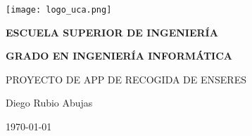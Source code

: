 

\begin{titlepage}

  \begin{center}

    \texttt{[image: logo\_uca.png]} \\
    
    \vspace{2.0cm}
    
    \LARGE{\textbf{ESCUELA SUPERIOR DE INGENIERÍA}} \\
    
    \vspace{1.0cm}
    
    \Large{\textbf{GRADO EN INGENIERÍA INFORMÁTICA}} \\
    
    \vspace{3.0cm}
    
    \Large{PROYECTO DE APP DE RECOGIDA DE ENSERES} \\
    
    \vspace{2.0cm}
    
    \Large{Diego Rubio Abujas} \\
  
    \vspace{0.5cm}

    \large{\today}
    
  \end{center}
\end{titlepage}
